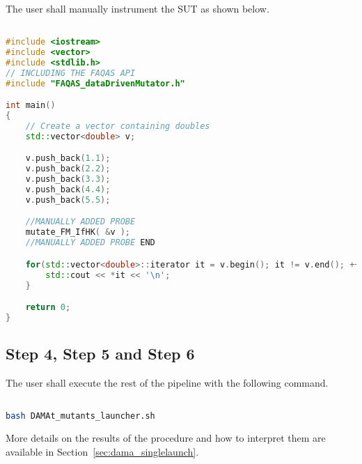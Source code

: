 The user shall manually instrument the SUT as shown below.
\begin{lstlisting}[language=c++]

#include <iostream>
#include <vector>
#include <stdlib.h>
// INCLUDING THE FAQAS API
#include "FAQAS_dataDrivenMutator.h"

int main()
{
    // Create a vector containing doubles
    std::vector<double> v;

    v.push_back(1.1);
    v.push_back(2.2);
    v.push_back(3.3);
    v.push_back(4.4);
    v.push_back(5.5);

    //MANUALLY ADDED PROBE
    mutate_FM_IfHK( &v );
    //MANUALLY ADDED PROBE END

    for(std::vector<double>::iterator it = v.begin(); it != v.end(); ++it) {
    	std::cout << *it << '\n';
    }

    return 0;
}

\end{lstlisting}


\subsection{Step 4, Step 5 and Step 6}

The user shall execute the rest of the pipeline with
the following command.

\begin{lstlisting}[language=bash]

bash DAMAt_mutants_launcher.sh

\end{lstlisting}

More details on the results of the \DAMA procedure and how to interpret them are available in Section~\ref{sec:dama_singlelaunch}.

\ENDCHANGEDWPT